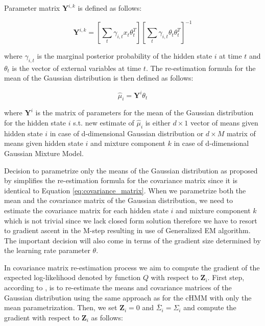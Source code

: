 Parameter matrix $\textbf{Y}^{i,k}$ is defined as follows:

\begin{equation}
    \textbf{Y}^{i,k} = \left[\sum_{t} \gamma_{i,t} x_t \theta_t^T\right] \left[ \sum_{t} \gamma_{i,t} \theta_t \theta_t^T \right]^{-1}
\end{equation}

where $\gamma_{i,t}$ is the marginal posterior probability of the hidden state $i$ at time $t$ and $\theta_t$ is the vector of external variables at time $t$.
The re-estimation formula for the mean of the Gaussian distribution is then defined as follows:

\begin{equation}
    \hat{\mu}_i = \textbf{Y}^{i} \theta_t
\end{equation}

where $\textbf{Y}^{i}$ is the matrix of parameters for the mean of the Gaussian distribution for the hidden state $i$ s.t. 
new estimate of $\hat{\mu}_i$ is either $d \times 1$ vector of means given hidden state $i$ in case of d-dimensional Gaussian distribution or
$d \times M$ matrix of means given hidden state $i$ and mixture component $k$ in case of d-dimensional Gaussian Mixture Model.

Decision to parametrize only the means of the Gaussian distribution as proposed by \citep{Bobick1999} simplifies the re-estimation formula for the covariance matrix 
since it is identical to Equation \ref{eq:covariance_matrix}. When we parametrize both the mean and the covariance matrix of the Gaussian distribution,
we need to estimate the covariance matrix for each hidden state $i$ and mixture component $k$ which is not trivial since 
we lack closed form solution therefore we have to resort to gradient ascent in the M-step resulting in use of Generalized EM algorithm. 
The important decision will also come in terms of the gradient size determined by the learning rate parameter $\theta$. \citep{Radenen2014}

In covariance matrix re-estimation process we aim to compute the gradient of the expected log-likelihood denoted by function $Q$ with respect to $\textbf{Z}_i$.
First step, according to \citep{Radenen2014}, is to re-estimate the means and covariance matrices of the Gaussian distribution using the same approach as for 
the cHMM with only the mean parametrization. Then, we set $\textbf{Z}_i = 0$ and $\bar{\Sigma}_i = \Sigma_i$ and compute the gradient with respect to $\textbf{Z}_i$ as follows:


